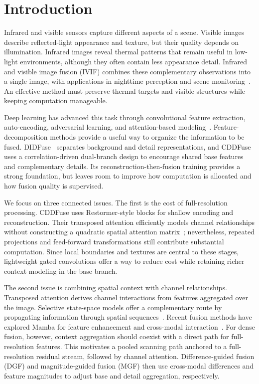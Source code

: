 \section{Introduction}\label{sec:intro}
Infrared and visible sensors capture different aspects of a scene. Visible images describe reflected-light appearance and texture, but their quality depends on illumination. Infrared images reveal thermal patterns that remain useful in low-light environments, although they often contain less appearance detail. Infrared and visible image fusion (IVIF) combines these complementary observations into a single image, with applications in nighttime perception and scene monitoring~\cite{ma2019survey,tang2022seafusion}. An effective method must preserve thermal targets and visible structures while keeping computation manageable.

Deep learning has advanced this task through convolutional feature extraction, auto-encoding, adversarial learning, and attention-based modeling~\cite{li2019densefuse,xu2022u2fusion,ma2019fusiongan,ma2022swinfusion}. Feature-decomposition methods provide a useful way to organize the information to be fused. DIDFuse~\cite{zhao2020didfuse} separates background and detail representations, and CDDFuse~\cite{zhao2023cddfuse} uses a correlation-driven dual-branch design to encourage shared base features and complementary details. Its reconstruction-then-fusion training provides a strong foundation, but leaves room to improve how computation is allocated and how fusion quality is supervised.

We focus on three connected issues. The first is the cost of full-resolution processing. CDDFuse uses Restormer-style blocks for shallow encoding and reconstruction. Their transposed attention efficiently models channel relationships without constructing a quadratic spatial attention matrix~\cite{zamir2022restormer}; nevertheless, repeated projections and feed-forward transformations still contribute substantial computation. Since local boundaries and textures are central to these stages, lightweight gated convolutions offer a way to reduce cost while retaining richer context modeling in the base branch.

The second issue is combining spatial context with channel relationships. Transposed attention derives channel interactions from features aggregated over the image. Selective state-space models offer a complementary route by propagating information through spatial sequences~\cite{gu2023mamba,liu2024vmamba}. Recent fusion methods have explored Mamba for feature enhancement and cross-modal interaction~\cite{xie2024fusionmamba,li2024mambadfuse}. For dense fusion, however, context aggregation should coexist with a direct path for full-resolution features. This motivates a pooled scanning path anchored to a full-resolution residual stream, followed by channel attention. Difference-guided fusion (DGF) and magnitude-guided fusion (MGF) then use cross-modal differences and feature magnitudes to adjust base and detail aggregation, respectively.

